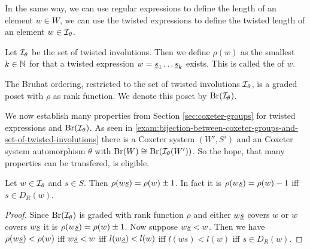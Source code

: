 In the same way, we can use regular expressions to define the length of an element $w \in W$, we can use the twisted expressions to define the twisted length of an element $w \in \mathcal{I}_{\theta}$.

\begin{defi}
	Let $\mathcal{I}_{\theta}$ be the set of twisted involutions. Then we define $\rho(w)$ as the smallest $k \in \mathbb{N}$ for that a twisted expression $w = \underline{s}_1 \ldots \underline{s}_k$ exists. This is called the  of $w$.
\end{defi}

\begin{lemm}
	The Bruhat ordering, restricted to the set of twisted involutions $\mathcal{I}_{\theta}$, is a graded poset with $\rho$ as rank function. We denote this poset by $\operatorname{Br}(\mathcal{I}_{\theta})$.
\end{lemm}

We now establish many properties from Section \ref{sec:coxeter-groups} for twisted expressions and $\operatorname{Br}(\mathcal{I}_{\theta})$. As seen in \ref{exam:bijection-between-coxeter-groups-and-set-of-twisted-involutions} there is a Coxeter system $(W',S')$ and an Coxeter system automorphism $\theta$ with $\operatorname{Br}(W) \cong \operatorname{Br}(\mathcal{I}_{\theta}(W'))$. So the hope, that many properties can be transfered, is eligible.

\begin{lemm}
	Let $w \in \mathcal{I}_{\theta}$ and $s \in S$. Then $\rho(w \underline{s}) = \rho(w) \pm 1$. In fact it is $\rho(w \underline{s}) = \rho(w) - 1$ iff $s \in D_R(w)$.

	\begin{proof}
		Since $\operatorname{Br}(\mathcal{I}_{\theta})$ is graded with rank function $\rho$ and either $w \underline{s}$ covers $w$ or $w$ covers $w \underline{s}$ it is $\rho(w \underline{s}) = \rho(w) \pm 1$. Now suppose $w \underline{s} < w$. Then we have $\rho(w \underline{s}) < \rho(w)$ iff $w \underline{s} < w$ iff $l(w \underline{s}) < l(w)$ iff $l(ws) < l(w)$ iff $s \in D_R(w)$.
	\end{proof}
\end{lemm}

